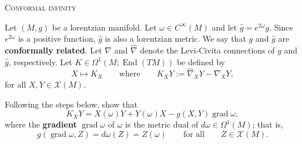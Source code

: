 \documentclass[10pt,a4paper]{exam}
\newcommand{\sttl}[1]{{\color{darkblue}\sffamily\bfseries #1}}
\newcommand{\doit}[1]{{\color{darkgreen}\sffamily\bfseries #1}}
\DeclareMathOperator{\End}{End}
\DeclareMathOperator{\grad}{grad}
\newcommand{\V}{\mathscr{X}}
\newcommand{\F}{C^\infty}
\begin{document}
\begin{center}\large
  \textsc{Conformal infinity}
\end{center}

Let $(M,g)$ be a lorentzian manifold.  Let $\omega \in \F(M)$ and let
$\widehat g = e^{2\omega} g$.  Since $e^{2\omega}$ is a positive function,
$\widehat g$ is also a lorentzian metric.  We say that $g$ and $\widehat g$
are \sttl{conformally related}.  Let $\nabla$ and $\hat\nabla$ denote
the Levi-Civita connections of $g$ and $\widehat g$, respectively.
Let $K \in \Omega^1(M;\End(TM))$ be defined by
\begin{equation*}
  X \mapsto K_X \qquad\text{where}\qquad K_XY := \hat\nabla_X Y - \nabla_X Y,
\end{equation*}
for all $X,Y \in \V(M)$.

\begin{questions}

\question Following the steps below, show that
  \begin{equation}\label{eq:k}
    K_X Y = X(\omega) Y + Y(\omega) X - g(X,Y) \grad\omega,
  \end{equation}
  where the \sttl{gradient} $\grad\omega$ of $\omega$ is the metric dual
  of $d\omega \in \Omega^1(M)$; that is,
  \begin{equation*}
    g(\grad\omega, Z) = d\omega(Z) = Z(\omega) \qquad\text{for all}\qquad Z \in \V(M).
  \end{equation*}

\end{questions}
\end{document}
